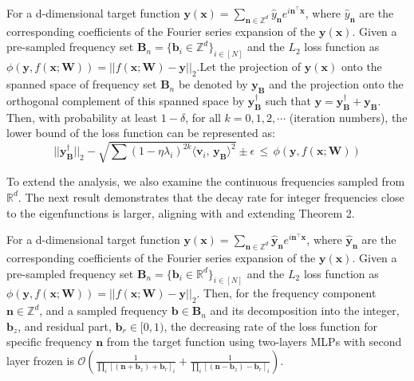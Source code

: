 \begin{thm:1}
   For a d-dimensional target function $\mathbf{y}(\mathbf{x}) = \sum_{\mathbf{n}\in\mathbb{Z}^d}\hat{y}_{\mathbf{n}}e^{i\mathbf{n}^{\top}\mathbf{x}}$, where $\hat{y}_{\mathbf{n}}$ are the corresponding coefficients of the Fourier series expansion of the $\mathbf{y}(\mathbf{x})$. Given a pre-sampled frequency set $\mathbf{B}_n = \{\mathbf{b}_i\in\mathbb{Z}^d\}_{i\in[N]}$ and the $L_2$ loss function as $\phi(\mathbf{y}, f(\mathbf{x};\mathbf{W})) = ||f(\mathbf{x};\mathbf{W})-\mathbf{y}||_2$.Let the projection of $\mathbf{y}(\mathbf{x})$ onto the spanned space of frequency set $\mathbf{B}_n$ be denoted by $\mathbf{y}_\mathbf{B}$ and the projection onto the orthogonal complement of this spanned space by $\mathbf{y}^{\dag}_\mathbf{B}$ such that $\mathbf{y} =\mathbf{y}^{\dag}_\mathbf{B}+\mathbf{y}_\mathbf{B} $. Then, with probability at least $1-\delta$, for all $k=0,1,2,\cdots$ (iteration numbers), the lower bound of the loss function can be represented as:
    \begin{equation}
        ||\mathbf{y}^{\dag}_\mathbf{B}||_2 -  \sqrt{\sum(1-\eta\lambda_i)^{2k}\langle\mathbf{v}_i,\,\mathbf{y}_\mathbf{B}\rangle^2}\pm\epsilon\, \leq\, \phi(\mathbf{y}, f(\mathbf{x};\mathbf{W}))
    \end{equation}
\end{thm:1}
To extend the analysis, we also examine the continuous frequencies sampled from $\mathbb{R}^d$. 
%
The next result demonstrates that the decay rate for integer frequencies close to the eigenfunctions is larger, aligning with and extending Theorem 2.
\begin{thm:1}
    For a d-dimensional target function $\mathbf{y}(\mathbf{x}) = \sum_{\mathbf{n}\in\mathbb{Z}^d}\hat{\mathbf{y}}_{\mathbf{n}}e^{i\mathbf{n}^{\top}\mathbf{x}}$, where $\hat{\mathbf{y}}_{\mathbf{n}}$ are the corresponding coefficients of the Fourier series expansion of the $\mathbf{y}(\mathbf{x})$. 
    Given a pre-sampled frequency set $\mathbf{B}_n = \{\mathbf{b}_i\in\mathbb{R}^d\}_{i\in[N]}$ and the $L_2$ loss function as $\phi(\mathbf{y}, f(\mathbf{x};\mathbf{W})) = ||f(\mathbf{x};\mathbf{W})-\mathbf{y}||_2$. 
    Then, for the frequency component $\mathbf{n}\in\mathbb{Z}^d$, and a sampled frequency $\mathbf{b}\in\mathbf{B}_n$ and its decomposition into the integer, $\mathbf{b}_z$, and residual part, $\mathbf{b}_r\in [0,1) $, the decreasing rate of the loss function for specific frequency $\mathbf{n}$ from the target function using two-layers MLPs with second layer frozen is $\mathcal{O}( \frac{1}{\prod_i[(\mathbf{n} + \mathbf{b}_z)+\mathbf{b} _r]_i}+ \frac{1}{\prod_i[(\mathbf{n} - \mathbf{b}_z)-\mathbf{b}_r]_i})$.
\end{thm:1}
